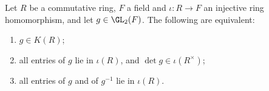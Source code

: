 Let $R$ be a commutative ring, $F$ a field and $\iota\colon R\to F$ an injective ring homomorphism, and let
$g\in\GL_2(F)$. The following are equivalent:
\begin{enumerate}[label=(\roman*)]
\item $g\in K(R)$;
\item all entries of $g$ lie in $\iota(R)$, and $\det g\in\iota(R^\times)$;
\item all entries of $g$ and of $g^{-1}$ lie in $\iota(R)$.
\end{enumerate}
